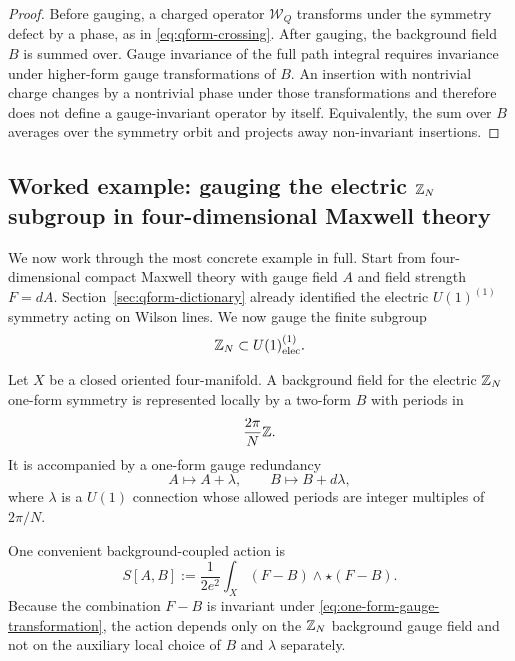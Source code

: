 \begin{proof}
Before gauging, a charged operator $\mathcal W_Q$ transforms under the symmetry defect by a phase, as in \eqref{eq:qform-crossing}. After gauging, the background field $B$ is summed over. Gauge invariance of the full path integral requires invariance under higher-form gauge transformations of $B$. An insertion with nontrivial charge changes by a nontrivial phase under those transformations and therefore does not define a gauge-invariant operator by itself. Equivalently, the sum over $B$ averages over the symmetry orbit and projects away non-invariant insertions.
\end{proof}

\subsection{Worked example: gauging the electric \texorpdfstring{$\mathbb{Z}_N$}{Z\_N} subgroup in four-dimensional Maxwell theory}

We now work through the most concrete example in full. Start from four-dimensional compact Maxwell theory with gauge field $A$ and field strength $F=dA$. Section~\ref{sec:qform-dictionary} already identified the electric $U(1)^{(1)}$ symmetry acting on Wilson lines. We now gauge the finite subgroup
\begin{equation*}
\mathbb{Z}_N \subset U(1)^{(1)}_{\mathrm{elec}}.
\end{equation*}

\begin{assumption}\label{ass:maxwell-zn-gauging}
Let $X$ be a closed oriented four-manifold. A background field for the electric $\mathbb{Z}_N$ one-form symmetry is represented locally by a two-form $B$ with periods in
\begin{equation*}
\frac{2\pi}{N}\mathbb{Z}.
\end{equation*}
It is accompanied by a one-form gauge redundancy
\begin{equation}\label{eq:one-form-gauge-transformation}
A \longmapsto A+\lambda,
\qquad
B \longmapsto B+d\lambda,
\end{equation}
where $\lambda$ is a $U(1)$ connection whose allowed periods are integer multiples of $2\pi/N$.
\end{assumption}

\begin{definition}\label{def:maxwell-background}
One convenient background-coupled action is
\begin{equation}\label{eq:maxwell-B-action}
S[A,B]
:=
\frac{1}{2e^2}\int_X (F-B)\wedge \star(F-B).
\end{equation}
Because the combination $F-B$ is invariant under \eqref{eq:one-form-gauge-transformation}, the action depends only on the $\mathbb{Z}_N$ background gauge field and not on the auxiliary local choice of $B$ and $\lambda$ separately.
\end{definition}

